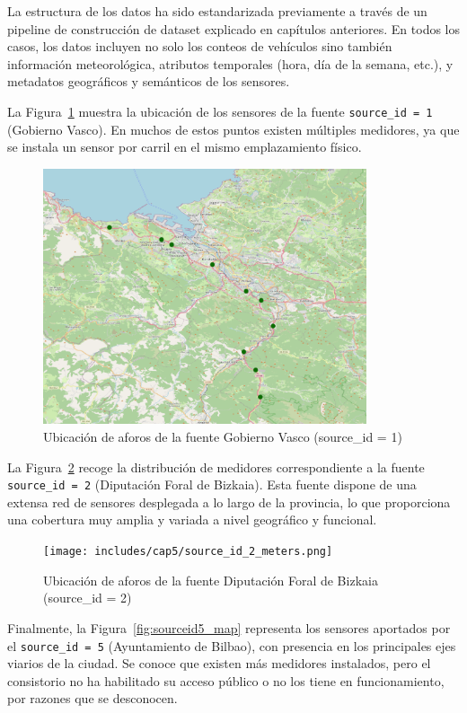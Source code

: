 La estructura de los datos ha sido estandarizada previamente a través de un pipeline de construcción de dataset explicado en capítulos anteriores. En todos los casos, los datos incluyen no solo los conteos de vehículos sino también información meteorológica, atributos temporales (hora, día de la semana, etc.), y metadatos geográficos y semánticos de los sensores.

La Figura~\ref{fig:sourceid1_map} muestra la ubicación de los sensores de la fuente \texttt{source\_id = 1} (Gobierno Vasco). En muchos de estos puntos existen múltiples medidores, ya que se instala un sensor por carril en el mismo emplazamiento físico.

\begin{figure}[H]
	\centering
	\includegraphics[width=0.85\textwidth]{includes/cap5/source_id_1_meters.png}
	\caption{Ubicación de aforos de la fuente Gobierno Vasco (source\_id = 1)}
	\label{fig:sourceid1_map}
\end{figure}

La Figura~\ref{fig:sourceid2_map} recoge la distribución de medidores correspondiente a la fuente \texttt{source\_id = 2} (Diputación Foral de Bizkaia). Esta fuente dispone de una extensa red de sensores desplegada a lo largo de la provincia, lo que proporciona una cobertura muy amplia y variada a nivel geográfico y funcional.

\begin{figure}[H]
	\centering
	\texttt{[image: includes/cap5/source\_id\_2\_meters.png]}
	\caption{Ubicación de aforos de la fuente Diputación Foral de Bizkaia (source\_id = 2)}
	\label{fig:sourceid2_map}
\end{figure}

Finalmente, la Figura~\ref{fig:sourceid5_map} representa los sensores aportados por el \texttt{source\_id = 5} (Ayuntamiento de Bilbao), con presencia en los principales ejes viarios de la ciudad. Se conoce que existen más medidores instalados, pero el consistorio no ha habilitado su acceso público o no los tiene en funcionamiento, por razones que se desconocen.

